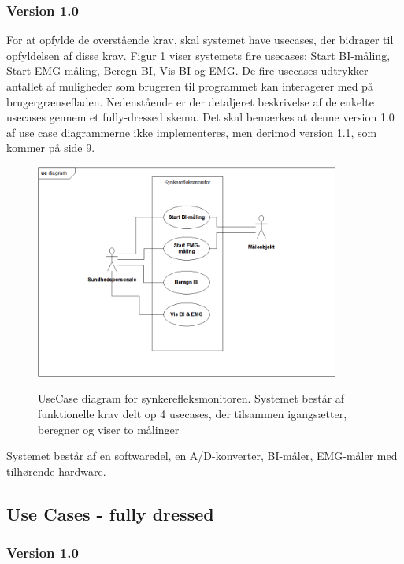 \subsubsection{Version 1.0} 

For at opfylde de overstående krav, skal systemet have usecases, der bidrager til opfyldelsen af disse krav.
Figur \ref{usecaseDiaV1} viser systemets fire  usecases: Start BI-måling, Start EMG-måling, Beregn BI, Vis BI og EMG. De fire usecases udtrykker antallet af muligheder som brugeren til programmet kan interagerer med på brugergrænsefladen.  Nedenstående er der detaljeret beskrivelse af de enkelte usecases gennem et fully-dressed skema. Det skal bemærkes at denne version 1.0 af use case diagrammerne ikke implementeres, men derimod version 1.1, som kommer på side 9.  


\begin{figure}[H]
\centering
{\includegraphics[width=10cm]
{Figure/usecaseDiaV1}}
\caption{UseCase diagram for synkerefleksmonitoren. Systemet består af funktionelle krav delt op 4 usecases, der tilsammen igangsætter, beregner og viser to målinger}
\label{usecaseDiaV1}
\end{figure}







Systemet består af en softwaredel, en A/D-konverter, BI-måler, EMG-måler med tilhørende hardware.






\subsection{Use Cases - fully dressed}

\subsubsection{Version 1.0}

